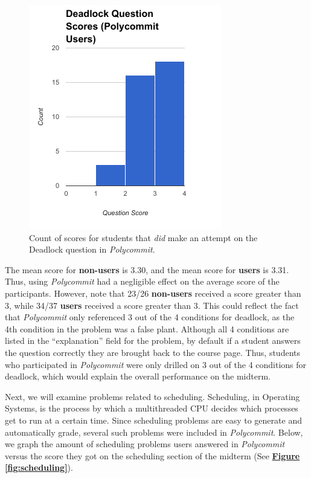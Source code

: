 \begin{figure}[h!b]
	\includegraphics[width=0.5\linewidth]{figures/deadlock-users}
	\caption{Count of scores for students that \textit{did} make an attempt on the Deadlock question in \textit{Polycommit}.}
	\label{fig:deadlock-yes}
\end{figure}

\par The mean score for \textbf{non-users} is 3.30, and the mean score for \textbf{users} is 3.31. Thus, using \textit{Polycommit} had a negligible effect on the average score of the participants. However, note that 23/26 \textbf{non-users} received a score greater than 3, while 34/37 \textbf{users} received a score greater than 3. This could reflect the fact that \textit{Polycommit} only referenced 3 out of the 4 conditions for deadlock, as the 4th condition in the problem was a false plant. Although all 4 conditions are listed in the ``explanation'' field for the problem, by default if a student answers the question correctly they are brought back to the course page. Thus, students who participated in \textit{Polycommit} were only drilled on 3 out of the 4 conditions for deadlock, which would explain the overall performance on the midterm.

\par Next, we will examine problems related to scheduling. Scheduling, in Operating Systems, is the process by which a multithreaded CPU decides which processes get to run at a certain time. Since scheduling problems are easy to generate and automatically grade, several such problems were included in \textit{Polycommit}. Below, we graph the amount of scheduling problems users answered in \textit{Polycommit} versus the score they got on the scheduling section of the midterm (See \textbf{\hyperref[fig:scheduling]{Figure \ref*{fig:scheduling}}}).

